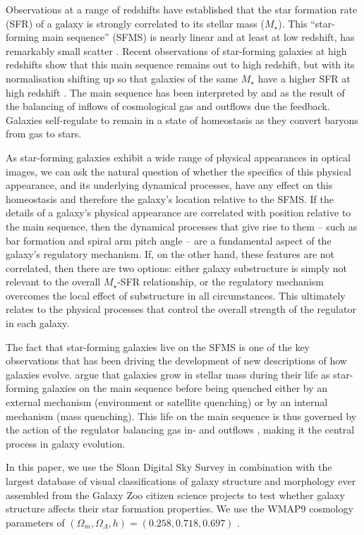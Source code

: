\documentclass{emulateapj}
\begin{document}
Observations at a range of redshifts have established that the star formation rate (SFR) of a galaxy is strongly correlated to its stellar mass ($M_\star$). This ``star-forming main sequence'' (SFMS) is nearly linear and at least at low redshift, has remarkably small scatter \citep{bri04}. Recent observations of star-forming galaxies at high redshifts show that this main sequence remains out to high redshift, but with its normalisation shifting up so that galaxies of the same $M_\star$ have a higher SFR at high redshift \citep{noe07,dad07}. The main sequence has been interpreted by \citet{bou10} and \citet{lil13} as the result of the balancing of inflows of cosmological gas and outflows due the feedback. Galaxies self-regulate to remain in a state of homeostasis as they convert baryons from gas to stars. 

As star-forming galaxies exhibit a wide range of physical appearances in optical images, we can ask the natural question of whether the specifics of this physical appearance, and its underlying dynamical processes, have any effect on this homeostasis and therefore the galaxy's location relative to the SFMS. If the details of a galaxy's physical appearance are correlated with position relative to the main sequence, then the dynamical processes that give rise to them -- such as bar formation and spiral arm pitch angle -- are a fundamental aspect of the galaxy's regulatory mechanism. If, on the other hand, these features are not correlated, then there are two options: either galaxy substructure is simply not relevant to the overall $M_\star$-SFR relationship, or the regulatory mechanism overcomes the local effect of substructure in all circumstances. This ultimately relates to the physical processes that control the overall strength of the regulator in each galaxy.

The fact that star-forming galaxies live on the SFMS is one of the key observations that has been driving the development of new descriptions of how galaxies evolve. \citet{pen10a,pen12} argue that galaxies grow in stellar mass during their life as star-forming galaxies on the main sequence before being quenched either by an external mechanism (environment or satellite quenching) or by an internal mechanism (mass quenching). This life on the main sequence is thus governed by the action of the regulator balancing gas in- and outflows \citet{lil13}, making it the central process in galaxy evolution.

In this paper, we use the Sloan Digital Sky Survey \citep{yor00,str02,aba09} in combination with the largest database of visual classifications of galaxy structure and morphology ever assembled from the Galaxy Zoo citizen science projects \citep{lin08,lin11,wil13} to test whether galaxy structure affects their star formation properties. We use the WMAP9 cosmology parameters of $(\Omega_m,\Omega_\Lambda,h)=(0.258,0.718,0.697)$ \citep{hin13}.
\end{document}

